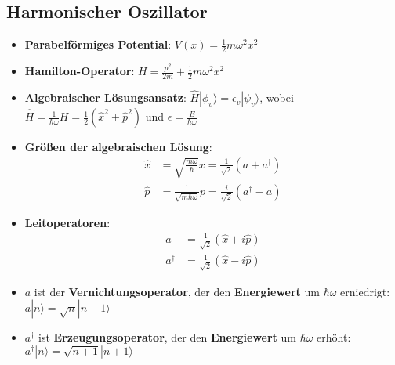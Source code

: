 \subsection{Harmonischer Oszillator}%
\label{quant:sub:harmonischer_oszillator}

\begin{itemize}
	\item \textbf{Parabelförmiges Potential}: $V(x) = \frac{1}{2}m\omega^2x^2$
	\item \textbf{Hamilton-Operator}: $H = \frac{p^2}{2m} + \frac{1}{2}m\omega^2x^2$
	\item \textbf{Algebraischer Lösungsansatz}: $\hat{H}|\phi_v\rangle = \epsilon_v|\psi_v\rangle$, wobei $\hat{H} = \frac{1}{\hbar\omega}H = \frac{1}{2}(\hat{x}^2 + \hat{p}^2)$ und $\epsilon = \frac{E}{\hbar\omega}$
	\item \textbf{Größen der algebraischen Lösung}:
	\begin{align*}
		\hat{x} &= \sqrt{\frac{m\omega}{\hbar}}x = \frac{1}{\sqrt{2}}(a + a^\dagger)\\
		\hat{p} &= \frac{1}{\sqrt{m\hbar\omega}}p = \frac{i}{\sqrt{2}}(a^\dagger - a)
	\end{align*}
	\item \textbf{Leitoperatoren}:
	\begin{align*}
		a &= \frac{1}{\sqrt{2}}(\hat{x} + i\hat{p})\\
		a^\dagger &= \frac{1}{\sqrt{2}}(\hat{x} - i\hat{p})
	\end{align*}
	\item $a$ ist der \textbf{Vernichtungsoperator}, der den \textbf{Energiewert} um $\hbar\omega$ erniedrigt: $a|n\rangle = \sqrt{n}|n - 1\rangle$
	\item $a^\dagger$ ist \textbf{Erzeugungsoperator}, der den \textbf{Energiewert} um $\hbar\omega$ erhöht: $a^\dagger|n\rangle = \sqrt{n + 1}|n + 1\rangle$
\end{itemize}